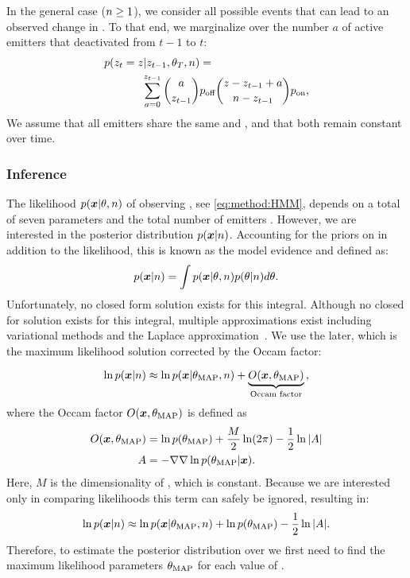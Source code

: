 In the general case ($n\geq1$), we consider all possible events that can
lead to an observed change in \z{}. To that end, we marginalize over the
number $a$ of active emitters that deactivated from $t-1$ to $t$:
  \begin{align}
    \label{eq:method:transition}
    p(z_{t} = z | z_{t-1}, \theta_{T}, n) &=\\
    \sum_{a = 0}^{z_{t-1}}
      {a \choose z_{t-1}}
      &\poff
      {z - z_{t-1} + a \choose \n - z_{t-1}}
      \pon
      \text{,} \notag
  \end{align}
  We assume that all emitters share the same \pon and \poff, and that
  both remain constant over time.


\subsubsection{Inference}

The likelihood $p(\bm{x}|\theta,n)$ of observing \trace, see
\eqref{eq:method:HMM}, depends on a total of seven parameters
\parameters and the total number of emitters \n.
  However, we are interested in the posterior distribution $p(\bm{x}|n)$.
  Accounting for the priors on \parameters in addition to the likelihood,
  this is known as the model evidence and defined as:
  \begin{equation*}
    p(\bm{x} | n) = \int p(\bm{x} | \theta, n) p(\theta | n) d\theta
    \text{.}
  \end{equation*}
  Unfortunately, no closed form solution exists for this integral. 
  Although no closed for solution exists for this integral, multiple approximations exist including 
  variational methods \cite{bronson_learning_2009} and the Laplace approximation~\citep{bishop_pattern_2006}.
  We use the later, which is the maximum likelihood solution corrected by the Occam factor:

  \begin{equation}
    \ln p(\bm{x} | n) \approx
      \ln p(\bm{x} | \theta_\text{MAP}, n) +
      \underbrace{O(\bm{x}, \theta_\text{MAP})}_\text{Occam factor}
    \text{,}
    \label{eq:method:evidence_with_m}
  \end{equation}
  where the Occam factor $O(\bm{x}, \theta_\text{MAP})$ is defined as
  \begin{align*}
    O(\bm{x}, \theta_\text{MAP}) &=
      \ln p(\theta_\text{MAP}) +
      \frac{M}{2} \ln(2\pi) -
      \frac{1}{2} \ln |A|
    \\
    A &=
      -\nabla \nabla \ln p(\theta_\text{MAP} | \bm{x})
    \text{.}
  \end{align*}
  Here, $M$ is the dimensionality of \parameters, which is constant.
  Because we are interested only in comparing likelihoods this term can 
  safely be ignored, resulting in:
  \begin{equation}
    \ln p(\bm{x} | n) \approx \ln p(\bm{x} | \theta_\text{MAP}, n) + \ln p(\theta_\text{MAP}) - \frac{1}{2} \ln |A|
    \text{.}
    \label{eq:method:evidence}
  \end{equation}
  Therefore, to estimate the posterior distribution over \n we first need to 
  find the maximum likelihood parameters $\theta_\text{MAP}$ for each value of \n. 

